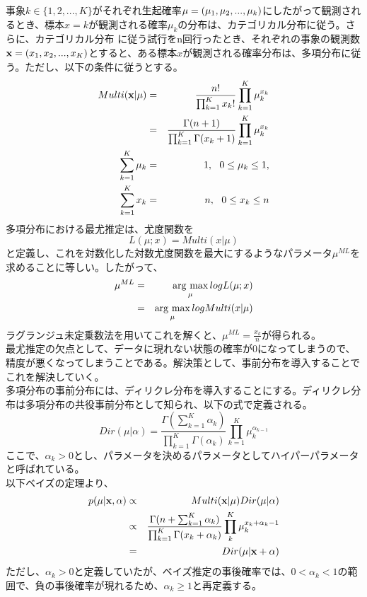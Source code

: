 \documentclass[uplatex,11pt]{jsarticle}
\newcommand{\argmax}{\mathop{\rm arg~max}\limits}
\begin{document}
事象$k \in \{1,2,...,K\}$がそれぞれ生起確率${\bf \mu} = (\mu_1,\mu_2,...,\mu_k)$にしたがって観測されるとき、標本$x = k$が観測される確率$\mu_k$の分布は、カテゴリカル分布に従う。さらに、カテゴリカル分布
に従う試行をn回行ったとき、それぞれの事象の観測数${\bf x} = (x_1,x_2,...,x_K)$とすると、ある標本$x$が観測される確率分布は、多項分布に従う。ただし、以下の条件に従うとする。
\begin{eqnarray*}
    Multi({\bf x}|\mu)  & = & \frac{n!}{\prod_{k=1}^K x_k!} \prod_{k=1}^K \mu_k^{x_k} \\
                        & = & \frac{\Gamma(n+1)}{\prod_{k=1}^{K} \Gamma(x_k + 1)} \prod_{k=1}^K \mu_k^{x_k} \\
    \sum_{k=1}^K \mu_k  & = & 1, \ \ 0 \leq \mu_k \leq 1, \\
    \sum_{k=1}^K x_k    & = & n, \ \ 0 \leq x_k \leq n
\end{eqnarray*}
多項分布における最尤推定は、尤度関数を
\[ L(\mu;x) = Multi(x|\mu)\]
と定義し、これを対数化した対数尤度関数を最大にするようなパラメータ$\mu^{ML}$を求めることに等しい。したがって、
\begin{eqnarray*}
    \mu^{ML} &=& \argmax_{\mu} logL(\mu;x)\\
             &=& \argmax_{\mu} log Multi(x|\mu)
\end{eqnarray*}
ラグランジュ未定乗数法を用いてこれを解くと、$\mu^{ML} = \frac{x_k}{n}$が得られる。\\
最尤推定の欠点として、データに現れない状態の確率が0になってしまうので、精度が悪くなってしまうことである。解決策として、事前分布を導入することでこれを解決していく。\\
多項分布の事前分布には、ディリクレ分布を導入することにする。ディリクレ分布は多項分布の共役事前分布として知られ、以下の式で定義される。
\[ Dir(\mu|\alpha) = \frac{\Gamma(\sum_{k=1}^{K}\alpha_k)}{\prod_{k=1}^{K} \Gamma(\alpha_k)}\prod_{k=1}^{K} \mu_{k}^{\alpha_{k-1}} \]
ここで、$\alpha_k > 0$とし、パラメータを決めるパラメータとしてハイパーパラメータと呼ばれている。\\
以下ベイズの定理より、
\begin{eqnarray*}
    p(\mu|{\bf x},\alpha)
    &\propto& Multi({\bf x}|\mu)Dir(\mu|\alpha)\\
    &\propto& \frac{\Gamma(n + \sum_{k=1}^{K}\alpha_k)}{\prod_{k=1}^{K} \Gamma(x_k + \alpha_k)}\prod_{k}^{K} \mu_{k}^{x_k+\alpha_k-1}\\
    & = &     Dir(\mu|{\bf x} + \alpha)
\end{eqnarray*}
ただし、$\alpha_k > 0$と定義していたが、ベイズ推定の事後確率では、$0< \alpha_k < 1$の範囲で、負の事後確率が現れるため、$\alpha_k \geq 1$と再定義する。\\
\end{document}
